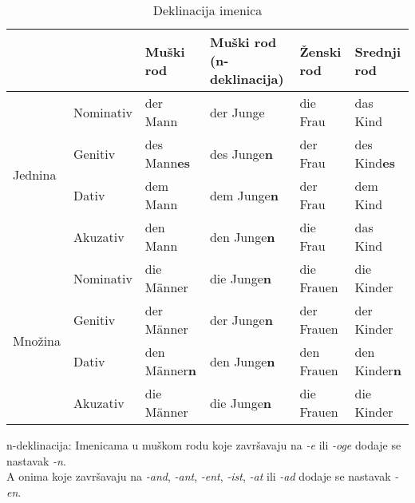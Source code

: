 \documentclass[12pt,german]{article}
\newcommand{\nastavak}[1]{\emph{-#1}}
\begin{document}
\begin{multicols}{2}
\begin{table*}[htb]
\caption{Deklinacija imenica}
\begin{tabular}{llllll}
\toprule
  &  & Muški rod & Muški rod (n-deklinacija) & Ženski rod & Srednji rod \\
\midrule
\multirow{4}{3mm}{\begin{sideways}\parbox{15mm}{Jednina}\end{sideways}}
& Nominativ & der Mann & der Junge & die Frau & das Kind \\
& Genitiv & des Mann\bf{es} & des Junge\bf{n} & der Frau & des Kind\bf{es} \\
& Dativ & dem Mann & dem Junge\bf{n} & der Frau & dem Kind \\
& Akuzativ & den Mann & den Junge\bf{n} & die Frau & das Kind \\
\midrule
\multirow{4}{3mm}{\begin{sideways}\parbox{15mm}{Množina}\end{sideways}}
& Nominativ & die M\"anner & die Junge\bf{n} & die Frauen & die Kinder \\
& Genitiv & der M\"anner & der Junge\bf{n} & der Frauen & der Kinder \\
& Dativ & den M\"anner\bf{n} & den Junge\bf{n} & den Frauen & den Kinder\bf{n} \\
& Akuzativ & die M\"anner & die Junge\bf{n} & die Frauen & die Kinder \\
\bottomrule
\end{tabular}
\begin{tablenotes}
  \small
  \item n-deklinacija: Imenicama u muškom rodu koje završavaju na \nastavak{e}
    ili \nastavak{oge} dodaje se nastavak \nastavak{n}.\\
    A onima koje završavaju na \nastavak{and}, \nastavak{ant}, \nastavak{ent},
    \nastavak{ist}, \nastavak{at} ili \nastavak{ad} dodaje se nastavak
    \nastavak{en}.
\end{tablenotes}
\end{table*}


\end{multicols}
\end{document}
